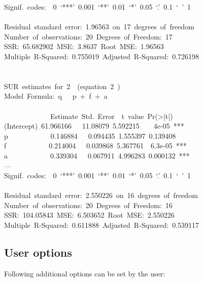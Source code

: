 \documentclass[article]{jss}
\begin{document}
{Signif.~codes:~~0~`***'~0.001~`**'~0.01~`*'~0.05~`.'~0.1~`~'~1~\\
~\\
Residual~standard~error:~1.96563~on~17~degrees~of~freedom~\\
Number~of~observations:~20~Degrees~of~Freedom:~17~\\
SSR:~65.682902~MSE:~3.8637~Root~MSE:~1.96563~\\
Multiple~R-Squared:~0.755019~Adjusted~R-Squared:~0.726198~\\
~\\
~\\
SUR~estimates~for~2~~(equation~2~)~\\
Model~Formula:~q~~~p~+~f~+~a\\
\\
\mbox{}~~~~~~~~~~~~~Estimate~Std.~Error~~t~value~Pr(>|t|)~\\
(Intercept)~61.966166~~~11.08079~5.592215~~~~4e-05~***~\\
p~~~~~~~~~~~~0.146884~~~0.094435~1.555397~0.139408~\\
f~~~~~~~~~~~~0.214004~~~0.039868~5.367761~~6.3e-05~***~\\
a~~~~~~~~~~~~0.339304~~~0.067911~4.996283~0.000132~***~\\
---~\\
Signif.~codes:~~0~`***'~0.001~`**'~0.01~`*'~0.05~`.'~0.1~`~'~1~\\
~\\
Residual~standard~error:~2.550226~on~16~degrees~of~freedom~\\
Number~of~observations:~20~Degrees~of~Freedom:~16~\\
SSR:~104.05843~MSE:~6.503652~Root~MSE:~2.550226~\\
Multiple~R-Squared:~0.611888~Adjusted~R-Squared:~0.539117~\\
}



\subsection{User options}

Following additional options can be set by the user:

\end{document}
